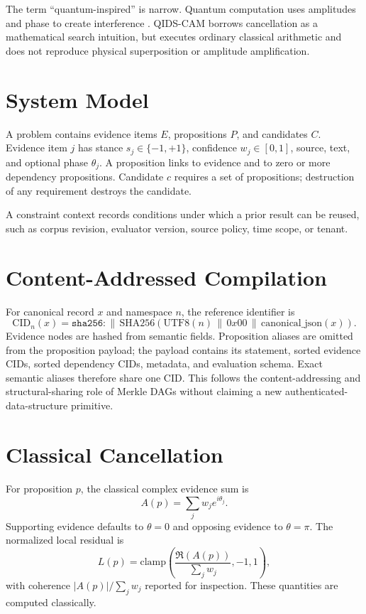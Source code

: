 \documentclass[11pt]{article}
\begin{document}
The term ``quantum-inspired'' is narrow. Quantum computation uses amplitudes and phase to create interference \cite{grover1996}. QIDS-CAM borrows cancellation as a mathematical search intuition, but executes ordinary classical arithmetic and does not reproduce physical superposition or amplitude amplification.

\section{System Model}
A problem contains evidence items $E$, propositions $P$, and candidates $C$. Evidence item $j$ has stance $s_j\in\{-1,+1\}$, confidence $w_j\in[0,1]$, source, text, and optional phase $\theta_j$. A proposition links to evidence and to zero or more dependency propositions. Candidate $c$ requires a set of propositions; destruction of any requirement destroys the candidate.

A constraint context records conditions under which a prior result can be reused, such as corpus revision, evaluator version, source policy, time scope, or tenant.

\section{Content-Addressed Compilation}
For canonical record $x$ and namespace $n$, the reference identifier is
\begin{equation}
\mathrm{CID}_n(x)=\texttt{sha256:}\,\|\,\mathrm{SHA256}(\mathrm{UTF8}(n)\,\|\,0x00\,\|\,\mathrm{canonical\_json}(x)).
\end{equation}
Evidence nodes are hashed from semantic fields. Proposition aliases are omitted from the proposition payload; the payload contains its statement, sorted evidence CIDs, sorted dependency CIDs, metadata, and evaluation schema. Exact semantic aliases therefore share one CID. This follows the content-addressing and structural-sharing role of Merkle DAGs \cite{ipfsmerkledag} without claiming a new authenticated-data-structure primitive.

\section{Classical Cancellation}
For proposition $p$, the classical complex evidence sum is
\begin{equation}
A(p)=\sum_j w_j e^{i\theta_j}.
\end{equation}
Supporting evidence defaults to $\theta=0$ and opposing evidence to $\theta=\pi$. The normalized local residual is
\begin{equation}
L(p)=\mathrm{clamp}\left(\frac{\Re(A(p))}{\sum_j w_j},-1,1\right),
\end{equation}
with coherence $|A(p)|/\sum_jw_j$ reported for inspection. These quantities are computed classically.
\end{document}
